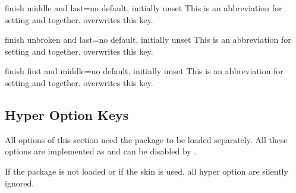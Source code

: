\begin{docTcbKey}{finish middle and last}{=}{no default, initially unset}
  This is an abbreviation for setting
   and
   together.
   overwrites this key.
\end{docTcbKey}

\begin{docTcbKey}{finish unbroken and last}{=}{no default, initially unset}
  This is an abbreviation for setting
   and
   together.
   overwrites this key.
\end{docTcbKey}


\begin{docTcbKey}[][doc new=2014-09-19]{finish first and middle}{=}{no default, initially unset}
  This is an abbreviation for setting
   and
   together.
   overwrites this key.
\end{docTcbKey}

\clearpage
\subsection{Hyper Option Keys}\label{subsec:hyper}
All options of this section need the package  \cite{rahtz:hyperref}
to be loaded separately. All these options are implemented as
 and can be disabled by .

\begin{marker}
If the package  \cite{rahtz:hyperref} is not loaded or if
the  skin is used, all hyper option are silently ignored.
\end{marker}


